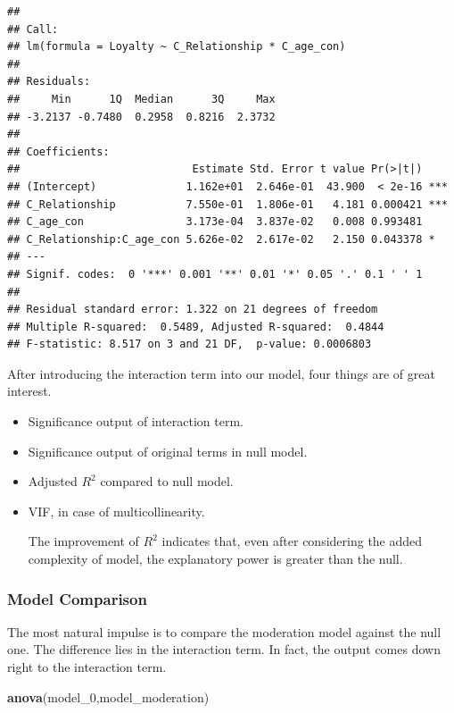 \documentclass[
]{ctexart}
\newenvironment{Shaded}{\begin{snugshade}}{\end{snugshade}}
\newcommand{\FunctionTok}[1]{\textcolor[rgb]{0.13,0.29,0.53}{\textbf{#1}}}
\newcommand{\NormalTok}[1]{#1}
\begin{document}
\begin{verbatim}
## 
## Call:
## lm(formula = Loyalty ~ C_Relationship * C_age_con)
## 
## Residuals:
##     Min      1Q  Median      3Q     Max 
## -3.2137 -0.7480  0.2958  0.8216  2.3732 
## 
## Coefficients:
##                           Estimate Std. Error t value Pr(>|t|)    
## (Intercept)              1.162e+01  2.646e-01  43.900  < 2e-16 ***
## C_Relationship           7.550e-01  1.806e-01   4.181 0.000421 ***
## C_age_con                3.173e-04  3.837e-02   0.008 0.993481    
## C_Relationship:C_age_con 5.626e-02  2.617e-02   2.150 0.043378 *  
## ---
## Signif. codes:  0 '***' 0.001 '**' 0.01 '*' 0.05 '.' 0.1 ' ' 1
## 
## Residual standard error: 1.322 on 21 degrees of freedom
## Multiple R-squared:  0.5489, Adjusted R-squared:  0.4844 
## F-statistic: 8.517 on 3 and 21 DF,  p-value: 0.0006803
\end{verbatim}

After introducing the interaction term into our model, four things are
of great interest.

\begin{itemize}
\item
  Significance output of interaction term.
\item
  Significance output of original terms in null model.
\item
  Adjusted \(R^2\) compared to null model.
\item
  VIF, in case of multicollinearity.

  The improvement of \(R^2\) indicates that, even after considering the
  added complexity of model, the explanatory power is greater than the
  null.
\end{itemize}

\hypertarget{model-comparison-3}{%
\subsubsection{Model Comparison}\label{model-comparison-3}}

The most natural impulse is to compare the moderation model against the
null one. The difference lies in the interaction term. In fact, the
output comes down right to the interaction term.

\begin{Shaded}
\begin{Highlighting}[]
\FunctionTok{anova}\NormalTok{(model\_0,model\_moderation)}
\end{Highlighting}
\end{Shaded}
\end{document}
